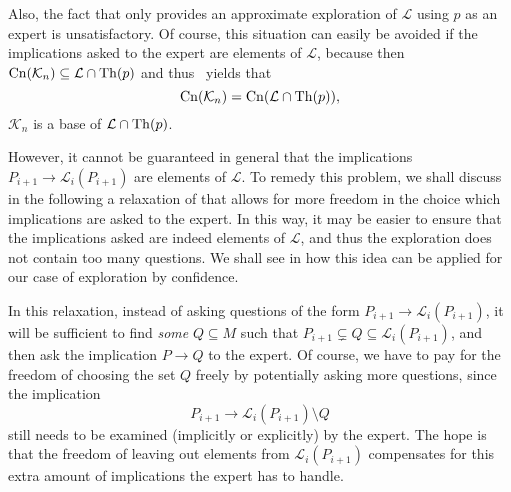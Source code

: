 Also, the fact that  only provides an approximate
exploration of $\mathcal{L}$ using $p$ as an expert is unsatisfactory.  Of course, this
situation can easily be avoided if the implications asked to the expert are elements of
$\mathcal{L}$, because then $\operatorname{Cn}(\mathcal{K}_{n}) \subseteq \mathcal{L} \cap \operatorname{Th}(p)$ and
thus~ yields that
\begin{equation*}
  \operatorname{Cn}(\mathcal{K}_{n}) = \operatorname{Cn}(\mathcal{L} \cap \operatorname{Th}(p)),
\end{equation*}
\ie $\mathcal{K}_{n}$ is a base of $\mathcal{L} \cap \operatorname{Th}(p)$.

However, it cannot be guaranteed in general that the implications $P_{i+1} \to
\mathcal{L}_{i}(P_{i+1})$ are elements of $\mathcal{L}$.  To remedy this problem, we shall
discuss in the following a relaxation of  that allows for
more freedom in the choice which implications are asked to the expert.  In this way, it
may be easier to ensure that the implications asked are indeed elements of $\mathcal{L}$,
and thus the exploration does not contain too many questions.  We shall see in
 how this idea can be applied for our case of exploration by
confidence.

In this relaxation, instead of asking questions of the form $P_{i+1} \to
\mathcal{L}_{i}(P_{i+1})$, it will be sufficient to find \emph{some} $Q \subseteq M$ such
that $P_{i+1} \subsetneq Q \subseteq \mathcal{L}_{i}(P_{i+1})$, and then ask the
implication $P \to Q$ to the expert.  Of course, we have to pay for the freedom of
choosing the set $Q$ freely by potentially asking more questions, since the implication
\begin{equation*}
  P_{i+1} \to \mathcal{L}_{i}(P_{i+1}) \setminus Q
\end{equation*}
still needs to be examined (implicitly or explicitly) by the expert.  The hope is that the
freedom of leaving out elements from $\mathcal{L}_{i}(P_{i+1})$ compensates for this extra
amount of implications the expert has to handle.


